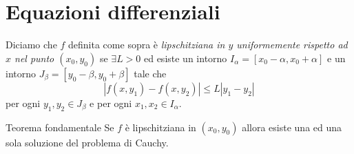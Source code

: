 \documentclass[a4paper]{article}
\begin{document}
\pagebreak

\section{Equazioni differenziali}

%



\begin{snippetdefinition}{}
    Diciamo che \(f\) definita come sopra è
    \emph{lipschitziana in \(y\) uniformemente rispetto ad \(x\) nel punto \((x_0, y_0)\)}
    se \(\exists L > 0\) ed esiste un intorno \(I_\alpha = [x_0 - \alpha, x_0 + \alpha]\)
    e un intorno \(J_\beta = [y_0 - \beta, y_0 + \beta]\) tale che
    \[
        |f(x, y_1) - f(x, y_2)| \leq L |y_1 - y_2|
    \]
    per ogni \(y_1, y_2 \in J_\beta\) e per ogni \(x_1, x_2 \in I_\alpha\).
\end{snippetdefinition}

\begin{snippettheorem}{Teorema fondamentale}
    Se \(f\) è lipschitziana in \((x_0, y_0)\)
    allora esiste una ed una sola soluzione del problema di Cauchy.
\end{snippettheorem}
\end{document}
